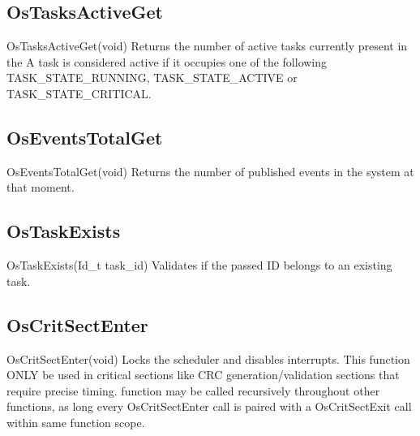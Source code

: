 \subsection{OsTasksActiveGet}
\label{func:OsTasksActiveGet}
\begin{pdfunction}
{OsTasksActiveGet(void) }
{ 
Returns the number of active tasks currently present in the 
A task is considered active if it occupies one of the following 
TASK\_STATE\_RUNNING, TASK\_STATE\_ACTIVE or TASK\_STATE\_CRITICAL. }
\end{pdfunction}

\subsection{OsEventsTotalGet}
\label{func:OsEventsTotalGet}
\begin{pdfunction}
{OsEventsTotalGet(void) }
{ 
Returns the number of published events in the system at that 
moment.}
\end{pdfunction}

\subsection{OsTaskExists}
\label{func:OsTaskExists}
\begin{pdfunction}
{OsTaskExists(Id\_t task\_id) }
{ 
Validates if the passed ID belongs to an existing task. }
\end{pdfunction}

\subsection{OsCritSectEnter}
\label{func:OsCritSectEnter}
\begin{pdfunction}
{OsCritSectEnter(void) }
{ 
Locks the scheduler and disables interrupts. This function 
ONLY be used in critical sections like CRC generation/validation 
sections that require precise timing. 
function may be called recursively throughout other functions, as long 
every OsCritSectEnter call is paired with a OsCritSectExit call within 
same function scope. }
\end{pdfunction}

